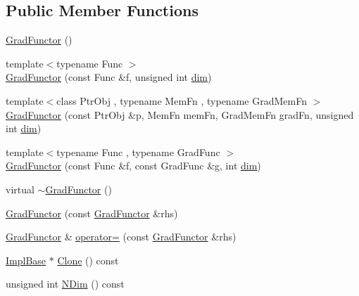 \subsection*{Public Member Functions}
\begin{DoxyCompactItemize}
\item 
\mbox{\hyperlink{classROOT_1_1Math_1_1GradFunctor_a68c75192981688e292ee84be652a8ec4}{Grad\+Functor}} ()
\item 
{\footnotesize template$<$typename Func $>$ }\\\mbox{\hyperlink{classROOT_1_1Math_1_1GradFunctor_a9cdbcd3d49494b4209524b3c5b3172d2}{Grad\+Functor}} (const Func \&f, unsigned int \mbox{\hyperlink{irrep__util_8cc_a70b5e28b5bc3d1b63a7435c5fe50b837}{dim}})
\item 
{\footnotesize template$<$class Ptr\+Obj , typename Mem\+Fn , typename Grad\+Mem\+Fn $>$ }\\\mbox{\hyperlink{classROOT_1_1Math_1_1GradFunctor_af7c06950b37bea8844b81f53b0bf41df}{Grad\+Functor}} (const Ptr\+Obj \&p, Mem\+Fn mem\+Fn, Grad\+Mem\+Fn grad\+Fn, unsigned int \mbox{\hyperlink{irrep__util_8cc_a70b5e28b5bc3d1b63a7435c5fe50b837}{dim}})
\item 
{\footnotesize template$<$typename Func , typename Grad\+Func $>$ }\\\mbox{\hyperlink{classROOT_1_1Math_1_1GradFunctor_a079a63821986eb0ce6e011c366c1cb9a}{Grad\+Functor}} (const Func \&f, const Grad\+Func \&g, int \mbox{\hyperlink{irrep__util_8cc_a70b5e28b5bc3d1b63a7435c5fe50b837}{dim}})
\item 
virtual \mbox{\hyperlink{classROOT_1_1Math_1_1GradFunctor_a1dfc4e8382f679a935eae97c5e7ee4dd}{$\sim$\+Grad\+Functor}} ()
\item 
\mbox{\hyperlink{classROOT_1_1Math_1_1GradFunctor_a629b55d9f326dbf39e5c3ccfb4678579}{Grad\+Functor}} (const \mbox{\hyperlink{classROOT_1_1Math_1_1GradFunctor}{Grad\+Functor}} \&rhs)
\item 
\mbox{\hyperlink{classROOT_1_1Math_1_1GradFunctor}{Grad\+Functor}} \& \mbox{\hyperlink{classROOT_1_1Math_1_1GradFunctor_a7f7a0c6b466d283cb6085f0e57ab1e6a}{operator=}} (const \mbox{\hyperlink{classROOT_1_1Math_1_1GradFunctor}{Grad\+Functor}} \&rhs)
\item 
\mbox{\hyperlink{classROOT_1_1Math_1_1GradFunctor_a1fb9161fc93c7e7fa185dddbcc2c4f4d}{Impl\+Base}} $\ast$ \mbox{\hyperlink{classROOT_1_1Math_1_1GradFunctor_a21093c0d3001069e49ce6278b5a32a40}{Clone}} () const
\item 
unsigned int \mbox{\hyperlink{classROOT_1_1Math_1_1GradFunctor_a7ff4ed4ad6f7c17d74403a443990f069}{N\+Dim}} () const

\end{DoxyCompactItemize}
